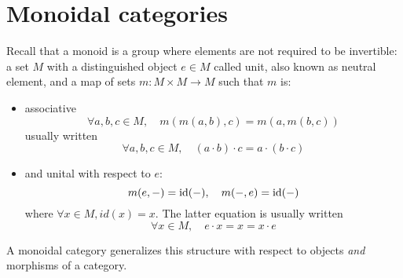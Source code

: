 \section{Monoidal categories}\label{MonCat}
Recall that a monoid is a group where elements are not required to be invertible: a set $M$ with a distinguished object $e\in M$ called unit, also known as neutral element, and a map of sets $m: M\times M \to M$ such that $m$ is:
\begin{itemize}
    \item associative $$
    \forall a,b,c\in M, \quad m(m(a,b),c)=m(a,m(b,c))
$$
usually written
$$
   \forall a,b,c\in M, \quad (a \cdot b) \cdot c = a\cdot (b \cdot c)
$$
\item and unital with respect to $e$:
$$
     m(e, -) =\operatorname{id}(-), \quad m(-, e) =\operatorname{id}(-)
$$
where $\forall x\in M, id(x)=x$. The latter equation is usually written $$
\forall x\in M, \quad e\cdot x=x=x\cdot e
$$
\end{itemize}
A monoidal category generalizes this structure with respect to objects \emph{and} morphisms of a category.
